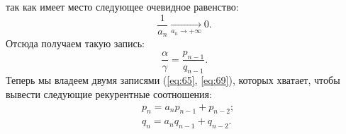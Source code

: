 \documentclass[12pt]{article}
\begin{document}
так как имеет место следующее очевидное равенство:
\begin{equation}
    \dfrac{1}{a_n}\underset{a_n\rightarrow +\infty}{\longrightarrow} 0.
\end{equation}
Отсюда получаем такую запись:
\begin{equation}\label{eq:69}
    \dfrac{\alpha}{\gamma} = \dfrac{p_{n-1}}{q_{n-1}}.
\end{equation}
Теперь мы владеем двумя записями (\ref{eq:65}, \ref{eq:69}), которых хватает, чтобы вывести следующие рекурентные соотношения:
\begin{equation}\label{eq:70}
    \begin{split}
        &p_n = a_n p_{n-1} + p_{n-2};\\
        &q_n = a_n q_{n-1} + q_{n-2}.
    \end{split}
\end{equation}
\end{document}

